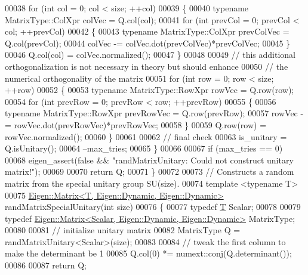 \begin{DoxyCode}
00038     \textcolor{keywordflow}{for} (\textcolor{keywordtype}{int} col = 0; col < size; ++col)
00039     \{
00040       \textcolor{keyword}{typename} MatrixType::ColXpr colVec = Q.col(col);
00041       \textcolor{keywordflow}{for} (\textcolor{keywordtype}{int} prevCol = 0; prevCol < col; ++prevCol)
00042       \{
00043         \textcolor{keyword}{typename} MatrixType::ColXpr prevColVec = Q.col(prevCol);
00044         colVec -= colVec.dot(prevColVec)*prevColVec;
00045       \}
00046       Q.col(col) = colVec.normalized();
00047     \}
00048 
00049     \textcolor{comment}{// this additional orthogonalization is not necessary in theory but should enhance}
00050     \textcolor{comment}{// the numerical orthogonality of the matrix}
00051     \textcolor{keywordflow}{for} (\textcolor{keywordtype}{int} row = 0; row < size; ++row)
00052     \{
00053       \textcolor{keyword}{typename} MatrixType::RowXpr rowVec = Q.row(row);
00054       \textcolor{keywordflow}{for} (\textcolor{keywordtype}{int} prevRow = 0; prevRow < row; ++prevRow)
00055       \{
00056         \textcolor{keyword}{typename} MatrixType::RowXpr prevRowVec = Q.row(prevRow);
00057         rowVec -= rowVec.dot(prevRowVec)*prevRowVec;
00058       \}
00059       Q.row(row) = rowVec.normalized();
00060     \}
00061 
00062     \textcolor{comment}{// final check}
00063     is\_unitary = Q.isUnitary();
00064     --max\_tries;
00065   \}
00066 
00067   \textcolor{keywordflow}{if} (max\_tries == 0)
00068     eigen\_assert(\textcolor{keyword}{false} && \textcolor{stringliteral}{"randMatrixUnitary: Could not construct unitary matrix!"});
00069 
00070   \textcolor{keywordflow}{return} Q;
00071 \}
00072 
00073 \textcolor{comment}{//  Constructs a random matrix from the special unitary group SU(size).}
00074 \textcolor{keyword}{template} <\textcolor{keyword}{typename} T>
00075 \hyperlink{group___core___module_class_eigen_1_1_matrix}{Eigen::Matrix<T, Eigen::Dynamic, Eigen::Dynamic>} 
      randMatrixSpecialUnitary(\textcolor{keywordtype}{int} size)
00076 \{
00077   \textcolor{keyword}{typedef} \hyperlink{group___sparse_core___module}{T} Scalar;
00078 
00079   \textcolor{keyword}{typedef} \hyperlink{group___core___module_class_eigen_1_1_matrix}{Eigen::Matrix<Scalar, Eigen::Dynamic, Eigen::Dynamic>}
       MatrixType;
00080 
00081   \textcolor{comment}{// initialize unitary matrix}
00082   MatrixType Q = randMatrixUnitary<Scalar>(size);
00083 
00084   \textcolor{comment}{// tweak the first column to make the determinant be 1}
00085   Q.col(0) *= numext::conj(Q.determinant());
00086 
00087   \textcolor{keywordflow}{return} Q;

\end{DoxyCode}
